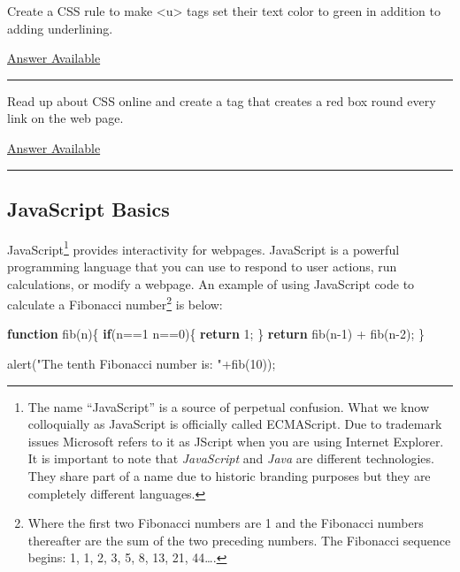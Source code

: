 \documentclass[]{memoir}
\newenvironment{Shaded}{}{}
\newcommand{\KeywordTok}[1]{\textcolor[rgb]{0.00,0.44,0.13}{\textbf{{#1}}}}
\newcommand{\DecValTok}[1]{\textcolor[rgb]{0.25,0.63,0.44}{{#1}}}
\newcommand{\StringTok}[1]{\textcolor[rgb]{0.25,0.44,0.63}{{#1}}}
\newcommand{\FunctionTok}[1]{\textcolor[rgb]{0.02,0.16,0.49}{{#1}}}
\newcommand{\NormalTok}[1]{{#1}}
\begin{document}

Create a CSS rule to make \textless{}u\textgreater{} tags set their text
color to green in addition to adding underlining.

\hyperref[Ans-12-4]{Answer Available}

\begin{center}\rule{3in}{0.4pt}\end{center}


Read up about CSS online and create a tag that creates a red box round
every link on the web page.

\hyperref[Ans-12-5]{Answer Available}

\begin{center}\rule{3in}{0.4pt}\end{center}

\subsection{JavaScript Basics}

JavaScript\footnote{The name ``JavaScript'' is a source of perpetual
  confusion. What we know colloquially as JavaScript is officially
  called ECMAScript. Due to trademark issues Microsoft refers to it as
  JScript when you are using Internet Explorer. It is important to note
  that \emph{JavaScript} and \emph{Java} are different technologies.
  They share part of a name due to historic branding purposes but they
  are completely different languages.} provides interactivity for
webpages. JavaScript is a powerful programming language that you can use
to respond to user actions, run calculations, or modify a webpage. An
example of using JavaScript code to calculate a Fibonacci
number\footnote{Where the first two Fibonacci numbers are 1 and the
  Fibonacci numbers thereafter are the sum of the two preceding numbers.
  The Fibonacci sequence begins: 1, 1, 2, 3, 5, 8, 13, 21, 44\ldots{}.}
is below:

\begin{Shaded}
\begin{Highlighting}[]
\KeywordTok{function} \FunctionTok{fib}\NormalTok{(n)\{}
    \KeywordTok{if}\NormalTok{(n==}\DecValTok{1} \NormalTok{\textbar{}\textbar{} n==}\DecValTok{0}\NormalTok{)\{}
        \KeywordTok{return} \DecValTok{1}\NormalTok{;}
    \NormalTok{\}}
    \KeywordTok{return} \FunctionTok{fib}\NormalTok{(n}\DecValTok{-1}\NormalTok{) + }\FunctionTok{fib}\NormalTok{(n}\DecValTok{-2}\NormalTok{);}
\NormalTok{\}}

\FunctionTok{alert}\NormalTok{(}\StringTok{"The tenth Fibonacci number is: "}\NormalTok{+}\FunctionTok{fib}\NormalTok{(}\DecValTok{10}\NormalTok{));}
\end{Highlighting}
\end{Shaded}
\end{document}
